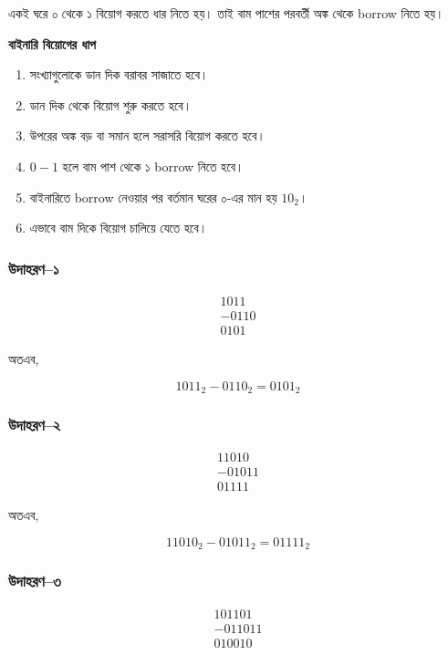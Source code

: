 একই ঘরে ০ থেকে ১ বিয়োগ করতে ধার নিতে হয়।
তাই বাম পাশের পরবর্তী অঙ্ক থেকে
\textenglish{borrow} নিতে হয়।

\par\begingroup

\textbf{বাইনারি বিয়োগের ধাপ}

\begin{enumerate}
    \item সংখ্যাগুলোকে ডান দিক বরাবর সাজাতে হবে।
    \item ডান দিক থেকে বিয়োগ শুরু করতে হবে।
    \item উপরের অঙ্ক বড় বা সমান হলে সরাসরি বিয়োগ করতে হবে।
    \item $0-1$ হলে বাম পাশ থেকে ১ \textenglish{borrow} নিতে হবে।
    \item বাইনারিতে \textenglish{borrow} নেওয়ার পর বর্তমান ঘরের
    ০-এর মান হয় $10_2$।
    \item এভাবে বাম দিকে বিয়োগ চালিয়ে যেতে হবে।
\end{enumerate}
\par\endgroup


\subsubsection*{উদাহরণ--১}

\[
\begin{array}{r}
1011\\
-0110\\
\hline
0101
\end{array}
\]

অতএব,

\[
\boxed{1011_2-0110_2=0101_2}
\]

\subsubsection*{উদাহরণ--২}

\[
\begin{array}{r}
11010\\
-01011\\
\hline
01111
\end{array}
\]

অতএব,

\[
\boxed{11010_2-01011_2=01111_2}
\]

\subsubsection*{উদাহরণ--৩}

\[
\begin{array}{r}
101101\\
-011011\\
\hline
010010
\end{array}
\]

